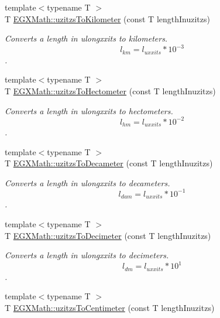 \begin{DoxyCompactItemize}
{\footnotesize template$<$typename T $>$ }\\T \mbox{\hyperlink{group___e_g_x_math-_conversions-_length_conversions-_non-_s_i-uzitzs-_s_i_ga43a39eb66f3250c955de8fb2beff314c}{E\+G\+X\+Math\+::uzitzs\+To\+Kilometer}} (const T length\+Inuzitzs)
\begin{DoxyCompactList}\small\item\em Converts a length in ulongxxits to kilometers. \[ l_{km}=l_{uxxits} * 10^{-3} \]. \end{DoxyCompactList}\item 
{\footnotesize template$<$typename T $>$ }\\T \mbox{\hyperlink{group___e_g_x_math-_conversions-_length_conversions-_non-_s_i-uzitzs-_s_i_gabc1973b8ea47e021bd981f94ac1f254d}{E\+G\+X\+Math\+::uzitzs\+To\+Hectometer}} (const T length\+Inuzitzs)
\begin{DoxyCompactList}\small\item\em Converts a length in ulongxxits to hectometers. \[ l_{hm}=l_{uxxits} * 10^{-2} \]. \end{DoxyCompactList}\item 
{\footnotesize template$<$typename T $>$ }\\T \mbox{\hyperlink{group___e_g_x_math-_conversions-_length_conversions-_non-_s_i-uzitzs-_s_i_ga62dcf7a675d92ce74d56e67f2fed7ace}{E\+G\+X\+Math\+::uzitzs\+To\+Decameter}} (const T length\+Inuzitzs)
\begin{DoxyCompactList}\small\item\em Converts a length in ulongxxits to decameters. \[ l_{dam}=l_{uxxits} * 10^{-1} \]. \end{DoxyCompactList}\item 
{\footnotesize template$<$typename T $>$ }\\T \mbox{\hyperlink{group___e_g_x_math-_conversions-_length_conversions-_non-_s_i-uzitzs-_s_i_ga178324834750df4df1026a8900fadbcc}{E\+G\+X\+Math\+::uzitzs\+To\+Decimeter}} (const T length\+Inuzitzs)
\begin{DoxyCompactList}\small\item\em Converts a length in ulongxxits to decimeters. \[ l_{dm}=l_{uxxits} * 10^{1} \]. \end{DoxyCompactList}\item 
{\footnotesize template$<$typename T $>$ }\\T \mbox{\hyperlink{group___e_g_x_math-_conversions-_length_conversions-_non-_s_i-uzitzs-_s_i_ga1fb15b72a000d43348190004a49ed7bc}{E\+G\+X\+Math\+::uzitzs\+To\+Centimeter}} (const T length\+Inuzitzs)

\end{DoxyCompactItemize}
